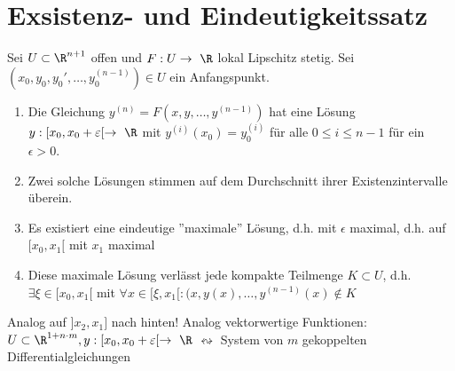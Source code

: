 \section{Exsistenz- und Eindeutigkeitssatz}
\begin{satz*}[note = Exsistenz- und Eindeutigkeitssatz , index = Differentialgleichung Exsistenz und Eindeutigkeits satz , indexformat = {1!2-34.5 5!2-34-~}]
	Sei $U \subset \R^{n+1}$ offen und $F: U \rightarrow \R$ lokal Lipschitz stetig. Sei $( x_0 , y_0 , y_0' , \dotsc , y_0^{(n-1)} ) \in U$ ein Anfangspunkt.
	\begin{enumerate}[label=(\alph*)]
		\item Die Gleichung $y^{(n)} = F( x , y , \dotsc , y^{(n-1)} )$ hat eine Lösung $y : [x_0 , x_0 + \epsilon [ \rightarrow \R$ mit $y^{(i)}(x_0) = y_0^{(i)}$ für alle $0 \leq i \leq n-1$ für ein $\epsilon > 0$.
		\item Zwei solche Lösungen stimmen auf dem Durchschnitt ihrer Existenzintervalle überein.
		\item Es existiert eine eindeutige ''maximale'' Lösung, d.h. mit $\epsilon$ maximal, d.h. auf $[ x_0 , x_1 [$ mit $x_1$ maximal
		\item Diese maximale Lösung verlässt jede kompakte Teilmenge $K \subset U$, d.h. $\exists \xi \in [ x_0 , x_1 [$ mit $\forall x \in [ \xi , x_1 [ : ( x , y(x) , \dotsc , y^{(n-1)}(x) \notin K$
	\end{enumerate}
	Analog auf $] x_2 , x_1 ]$ nach hinten!
	Analog vektorwertige Funktionen: $U \subset \R^{1+n \cdot m} , y: [x_0 , x_0+\epsilon [ \rightarrow \R$ $\leftrightsquigarrow$ System von $m$ gekoppelten Differentialgleichungen
\end{satz*}
